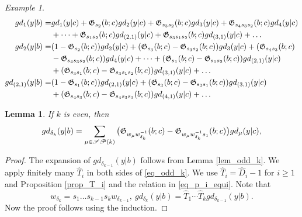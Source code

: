\documentclass[a4paper]{amsart}
\newtheorem{lem}[thm]{Lemma}
\theoremstyle{remark}
\newtheorem{example}[thm]{Example}
\numberwithin{equation}{section}
\begin{document}
\begin{example}\label{ex_exp}
\begin{align*}
gd_1(y| b)=&gd_1(y| c)+\mathfrak{G}_{s_2}(b;c)gd_2(y| c)+\mathfrak{G}_{s_3s_2}(b;c)gd_3(y| c)+\mathfrak{G}_{s_4s_3s_2}(b;c)gd_4(y| c)\\
&+\dots+\mathfrak{G}_{s_1s_2}(b;c)gd_{(2,1)}(y| c)+\mathfrak{G}_{s_3s_1s_2}(b;c)gd_{(3,1)}(y| c)+\dots\\
gd_2(y| b)=&(1-\mathfrak{G}_{s_2}(b;c))gd_2(y| c)+(\mathfrak{G}_{s_3}(b;c)-\mathfrak{G}_{s_3s_2}(b;c))gd_3(y| c)+(\mathfrak{G}_{s_4s_3}(b;c)\\ &-\mathfrak{G}_{s_4s_3s_2}(b;c))gd_4(y| c)+\dots+(\mathfrak{G}_{s_1}(b;c)-\mathfrak{G}_{s_1s_2}(b;c))gd_{(2,1)}(y| c)\\
&+(\mathfrak{G}_{s_3s_1}(b;c)-\mathfrak{G}_{s_3s_1s_2}(b;c))gd_{(3,1)}(y| c)+\dots\\
gd_{(2,1)}(y| b)=&(1-\mathfrak{G}_{s_1}(b;c))gd_{(2,1)}(y| c)+(\mathfrak{G}_{s_3}(b;c)-\mathfrak{G}_{s_3s_1}(b;c))gd_{(3,1)}(y| c)\\
&+(\mathfrak{G}_{s_4s_3}(b;c)-\mathfrak{G}_{s_4s_3s_1}(b;c))gd_{(4,1)}(y| c)+\dots
\end{align*}
\end{example}






\begin{lem}\label{lem_even_k}
    If $k$ is even, then 
$$gd_{\delta_k}(y| b)=\sum_{\mu\in \mathscr{SP}(k)} \big(\mathfrak{G} _{w_{{\mu}}w_{\delta_k}^{-1}}(b;c)- \mathfrak{G} _{w_{{\mu}}w_{\delta_k}^{-1}s_1}(b;c)\big)gd_{\mu}(y| c),$$ 
\end{lem}
 \begin{proof}
The expansion of $gd_{\delta_{k-1}}(y| b)$ follows from Lemma \ref{lem_odd_k}. We apply finitely many $\hat{T}_i$ in both sides of \eqref{eq_odd_k}. We use $\hat{T}_i=\hat{D}_i-1$ for $i\geq 1$ and Proposition \ref{prop_T_i} and the relation in \eqref{eq_p_i_equi}. Note that $$w_{\delta_k}=s_1\dots s_{k-1}s_kw_{\delta_{k-1}}, ~gd_{\delta_k}(y| b) = \hat{T}_1\cdots \hat{T}_{k} gd_{\delta_{k-1}}(y| b).$$  Now the proof follows using the induction.  
 \end{proof}   
\end{document}
